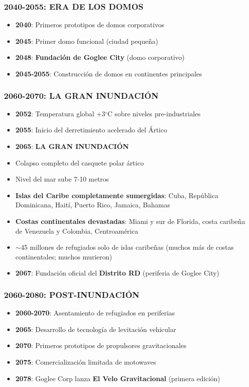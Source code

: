 \documentclass[11pt,a4paper]{report}
\begin{document}
\subsubsection{2040-2055: ERA DE LOS DOMOS}
\begin{itemize}
  \item \textbf{2040}: Primeros prototipos de domos corporativos
  \item \textbf{2045}: Primer domo funcional (ciudad pequeña)
  \item \textbf{2048}: \textbf{Fundación de Goglee City} (domo corporativo)
  \item \textbf{2045-2055}: Construcción de domos en continentes principales

\end{itemize}
\subsubsection{2060-2070: LA GRAN INUNDACIÓN}
\begin{itemize}
  \item \textbf{2052}: Temperatura global +3$^\circ$C sobre niveles pre-industriales
  \item \textbf{2055}: Inicio del derretimiento acelerado del Ártico
  \item \textbf{2065}: \textbf{LA GRAN INUNDACIÓN}
  \item Colapso completo del casquete polar ártico
  \item Nivel del mar sube 7-10 metros
  \item \textbf{Islas del Caribe completamente sumergidas}: Cuba, República Dominicana, Haití, Puerto Rico, Jamaica, Bahamas
  \item \textbf{Costas continentales devastadas}: Miami y sur de Florida, costa caribeña de Venezuela y Colombia, Centroamérica
  \item $\sim$45 millones de refugiados solo de islas caribeñas (muchos más de costas continentales; muchos murieron)
  \item \textbf{2067}: Fundación oficial del \textbf{Distrito RD} (periferia de Goglee City)

\end{itemize}
\subsubsection{2060-2080: POST-INUNDACIÓN}
\begin{itemize}
  \item \textbf{2060-2070}: Asentamiento de refugiados en periferias
  \item \textbf{2065}: Desarrollo de tecnología de levitación vehicular
  \item \textbf{2070}: Primeros prototipos de propulsores gravitacionales
  \item \textbf{2075}: Comercialización limitada de motowaves
  \item \textbf{2078}: Goglee Corp lanza \textbf{El Velo Gravitacional} (primera edición)

\end{itemize}
\end{document}
